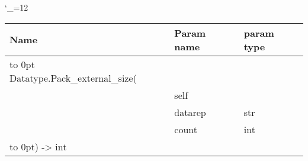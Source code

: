 \begingroup \catcode`\_=12 \tt
\begin{tabular}{lll}
\toprule
\textrm{Name}&\textrm{Param name}&\textrm{param type}\\
\midrule
\hbox to 0pt {Datatype.Pack_external_size(\hss}\\
& self\\
& datarep & str\\
& count & int\\
\hbox to 0pt{) -> int\hss}\\
\bottomrule
\end{tabular}
\endgroup
